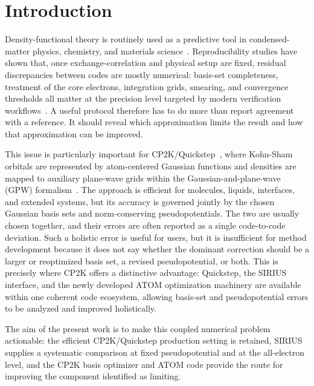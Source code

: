 \documentclass[aps,prb,reprint,amsmath,amssymb,superscriptaddress,longbibliography,floatfix]{revtex4-2}
\begin{document}
\maketitle

\section{Introduction}

Density-functional theory is routinely used as a predictive tool in condensed-matter physics, chemistry, and materials science~\cite{Kohn1999RMP,Jones2015RMP}. Reproducibility studies have shown that, once exchange-correlation and physical setup are fixed, residual discrepancies between codes are mostly numerical: basis-set completeness, treatment of the core electrons, integration grids, smearing, and convergence thresholds all matter at the precision level targeted by modern verification workflows~\cite{Lejaeghere2014,Lejaeghere2016,Huber2021,Bosoni2024}. A useful protocol therefore has to do more than report agreement with a reference. It should reveal which approximation limits the result and how that approximation can be improved.

This issue is particularly important for CP2K/Quickstep~\cite{CP2K2020,CP2KMadeSimple2026}, where Kohn-Sham orbitals are represented by atom-centered Gaussian functions and densities are mapped to auxiliary plane-wave grids within the Gaussian-and-plane-wave (GPW) formalism~\cite{Lippert1997GPW}. The approach is efficient for molecules, liquids, interfaces, and extended systems, but its accuracy is governed jointly by the chosen Gaussian basis sets and norm-conserving pseudopotentials. The two are usually chosen together, and their errors are often reported as a single code-to-code deviation. Such a holistic error is useful for users, but it is insufficient for method development because it does not say whether the dominant correction should be a larger or reoptimized basis set, a revised pseudopotential, or both. This is precisely where CP2K offers a distinctive advantage: Quickstep, the SIRIUS interface, and the newly developed ATOM optimization machinery are available within one coherent code ecosystem, allowing basis-set and pseudopotential errors to be analyzed and improved holistically.

The aim of the present work is to make this coupled numerical problem actionable: the efficient CP2K/Quickstep production setting is retained, SIRIUS supplies a systematic comparison at fixed pseudopotential and at the all-electron level, and the CP2K basis optimizer and ATOM code provide the route for improving the component identified as limiting.
\end{document}
